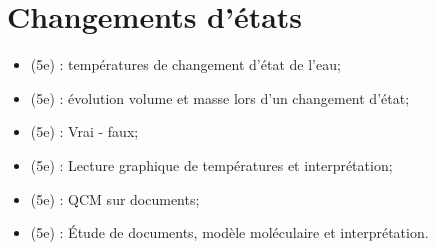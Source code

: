 \documentclass[12pt,a4paper]{article}
\begin{document}
\section{Changements d'états}



\begin{myexos}
	\begin{itemize}
		
		\item {} (5e) : températures de changement d'état de l'eau;
		\item {} (5e) : évolution volume et masse lors d'un changement d'état;
		\item {} (5e) : Vrai - faux;
		\item {} (5e) : Lecture graphique de températures et interprétation;
		\item {} (5e) : QCM sur documents;
		\item {} (5e) : \'Etude de documents, modèle moléculaire et interprétation.
	\end{itemize}
\end{myexos}



\appendix

\end{document}
